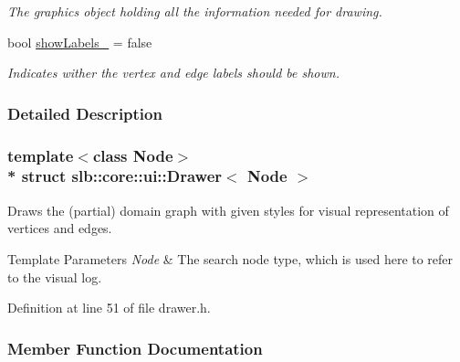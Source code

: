 \begin{DoxyCompactItemize}
\begin{DoxyCompactList}\small\item\em The graphics object holding all the information needed for drawing. \end{DoxyCompactList}\item 
bool \hyperlink{structslb_1_1core_1_1ui_1_1Drawer_a580db97e1c2261304eaa4dc63fb22c60}{show\+Labels\+\_\+} = false\hypertarget{structslb_1_1core_1_1ui_1_1Drawer_a580db97e1c2261304eaa4dc63fb22c60}{}\label{structslb_1_1core_1_1ui_1_1Drawer_a580db97e1c2261304eaa4dc63fb22c60}

\begin{DoxyCompactList}\small\item\em Indicates wither the vertex and edge labels should be shown. \end{DoxyCompactList}\end{DoxyCompactItemize}


\subsubsection{Detailed Description}
\subsubsection*{template$<$class Node$>$\\*
struct slb\+::core\+::ui\+::\+Drawer$<$ Node $>$}

Draws the (partial) domain graph with given styles for visual representation of vertices and edges. 


\begin{DoxyTemplParams}{Template Parameters}
{\em Node} & The search node type, which is used here to refer to the visual log. \\
\hline
\end{DoxyTemplParams}


Definition at line 51 of file drawer.\+h.



\subsubsection{Member Function Documentation}
